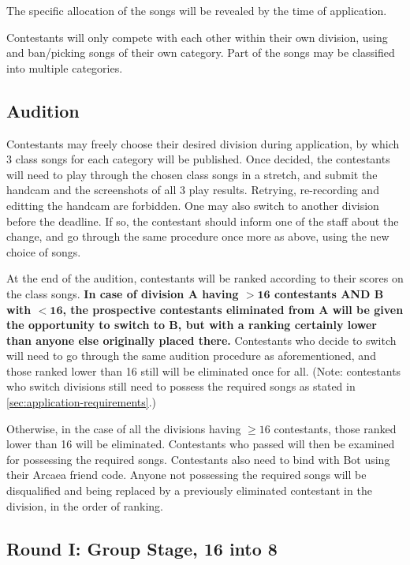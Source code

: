 \documentclass{article}
\newcommand{\alert}[1]{{\color{red} #1}}
\begin{document}
\alert{
	The specific allocation of the songs  %
	will be revealed by the time of application.
}

Contestants will only compete with each other
within their own division,
using and ban/picking songs of their own category.
Part of the songs may be classified into multiple categories.

\subsection  {Audition}

Contestants may freely choose their desired division
during application,
by which 3 class songs for each category will be published.
Once decided, the contestants will need to play through the chosen class songs in a stretch,
and submit the handcam and the screenshots of all 3 play results.
Retrying, re-recording and editting the handcam are forbidden.  %
One may also switch to another division before the deadline.
If so, the contestant should inform one of the staff about the change,
and go through the same procedure once more as above,
using the new choice of songs.  %

At the end of the audition,
contestants will be ranked
according to their scores on the class songs.
\textbf{In case of division A having $\mathbf{> 16}$ contestants
	AND B with $\mathbf{< 16}$,
	the prospective contestants eliminated from A
	will be given the opportunity to switch to B,
	but with a ranking certainly lower than
	anyone else originally placed there.}
Contestants who decide to switch
will need to go through the same
audition procedure as aforementioned,
and those ranked lower than 16 still will be eliminated
once for all.  %
(Note: contestants who switch divisions
still need to possess the required songs
as stated in \cref{sec:application-requirements}.)

Otherwise, in the case of
all the divisions having $\geq 16$ contestants,
those ranked lower than 16 will be eliminated.
Contestants who passed will then be examined for
possessing the required songs.
Contestants also need to bind with Bot
using their Arcaea friend code.
Anyone not possessing the required songs
will be disqualified and being
replaced by a previously eliminated
contestant in the division,
in the order of ranking.

\subsection {Round I: Group Stage, 16 into 8}
\end{document}
